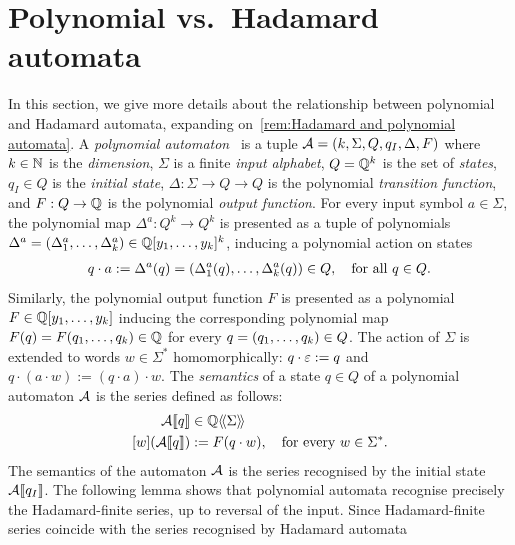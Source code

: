 
\section{Polynomial vs.~Hadamard automata}
\label{app:polynomial automata}

In this section, we give more details about the relationship
between polynomial and Hadamard automata,
expanding on~\cref{rem:Hadamard and polynomial automata}.
%
%
A \emph{polynomial automaton}~\cite{BenediktDuffSharadWorrell:PolyAut:LICS:2017} is a tuple
$\AA = \tuple{k, \Sigma, Q, q_I, \Delta, F}$
where $k \in \N$ is the \emph{dimension},
$\Sigma$ is a finite \emph{input alphabet},
$Q = \Q^k$ is the set of \emph{states},
$q_I \in Q$ is the \emph{initial state},
$\Delta : \Sigma \to Q \to Q$ is the polynomial \emph{transition function},
and $F : Q \to \Q$ is the polynomial \emph{output function}.
%
For every input symbol $a \in \Sigma$,
the polynomial map $\Delta^a : Q^k \to Q^k$
is presented as a tuple of polynomials $\Delta^a = \tuple{\Delta^a_1, \dots, \Delta^a_k} \in \poly \Q {y_1, \dots, y_k}^k$,
inducing a polynomial action on states
%
\begin{align*}
    q \cdot a := \Delta^a(q) = \tuple{\Delta^a_1(q), \dots, \Delta^a_k(q)} \in Q,
    \quad\text{for all } q \in Q.
\end{align*}
%
Similarly, the polynomial output function $F$ is presented as a polynomial $F \in \poly \Q {y_1, \dots, y_k}$
inducing the corresponding polynomial map
$F(q) = F(q_1, \dots, q_k) \in \Q$ for every $q = \tuple{q_1, \dots, q_k} \in Q$.
%
The action of $\Sigma$ is extended to words $w \in \Sigma^*$ homomorphically:
$q \cdot \e := q$ and $q \cdot (a \cdot w) := (q \cdot a) \cdot w$.
%
The \emph{semantics} of a state $q \in Q$ of a polynomial automaton $\AA$
is the series defined as follows:
%
\begin{align*}
    \Asem \AA q &\in \series \Q \Sigma \\
    \coefficient w (\Asem \AA q) &:= F(q \cdot w), \quad \text{for every } w \in \Sigma^*.
\end{align*}
%
The semantics of the automaton $\AA$ is the series recognised by the initial state
$\Asem \AA {q_I} {}$.
%
The following lemma shows that polynomial automata recognise precisely the Hadamard-finite series,
up to reversal of the input.
%
Since Hadamard-finite series coincide with the series recognised by Hadamard automata
